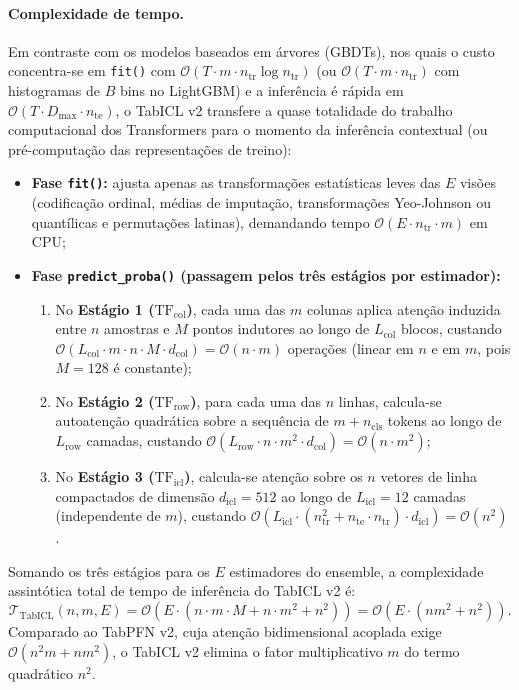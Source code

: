 \documentclass[11pt,a4paper]{article}
\begin{document}
\paragraph{Complexidade de tempo.}
Em contraste com os modelos baseados em árvores (GBDTs), nos quais o custo concentra-se em \texttt{fit()} com $\mathcal{O}(T \cdot m \cdot n_{\mathrm{tr}} \log n_{\mathrm{tr}})$ (ou $\mathcal{O}(T \cdot m \cdot n_{\mathrm{tr}})$ com histogramas de $B$ bins no LightGBM) e a inferência é rápida em $\mathcal{O}(T \cdot D_{\max} \cdot n_{\mathrm{te}})$, o TabICL v2 transfere a quase totalidade do trabalho computacional dos Transformers para o momento da inferência contextual (ou pré-computação das representações de treino):
\begin{itemize}[leftmargin=2em]
    \item \textbf{Fase \texttt{fit()}:} ajusta apenas as transformações estatísticas leves das $E$ visões (codificação ordinal, médias de imputação, transformações Yeo-Johnson ou quantílicas e permutações latinas), demandando tempo $\mathcal{O}(E \cdot n_{\mathrm{tr}} \cdot m)$ em CPU;
    \item \textbf{Fase \texttt{predict\_proba()} (passagem pelos três estágios por estimador):}
    \begin{enumerate}
        \item No \textbf{Estágio 1 ($\mathrm{TF}_{\mathrm{col}}$)}, cada uma das $m$ colunas aplica atenção induzida entre $n$ amostras e $M$ pontos indutores ao longo de $L_{\mathrm{col}}$ blocos, custando $\mathcal{O}(L_{\mathrm{col}} \cdot m \cdot n \cdot M \cdot d_{\mathrm{col}}) = \mathcal{O}(n \cdot m)$ operações (linear em $n$ e em $m$, pois $M = 128$ é constante);
        \item No \textbf{Estágio 2 ($\mathrm{TF}_{\mathrm{row}}$)}, para cada uma das $n$ linhas, calcula-se autoatenção quadrática sobre a sequência de $m + n_{\mathrm{cls}}$ tokens ao longo de $L_{\mathrm{row}}$ camadas, custando $\mathcal{O}(L_{\mathrm{row}} \cdot n \cdot m^2 \cdot d_{\mathrm{col}}) = \mathcal{O}(n \cdot m^2)$;
        \item No \textbf{Estágio 3 ($\mathrm{TF}_{\mathrm{icl}}$)}, calcula-se atenção sobre os $n$ vetores de linha compactados de dimensão $d_{\mathrm{icl}} = 512$ ao longo de $L_{\mathrm{icl}} = 12$ camadas (independente de $m$), custando $\mathcal{O}(L_{\mathrm{icl}} \cdot (n_{\mathrm{tr}}^2 + n_{\mathrm{te}} \cdot n_{\mathrm{tr}}) \cdot d_{\mathrm{icl}}) = \mathcal{O}(n^2)$.
    \end{enumerate}
\end{itemize}
Somando os três estágios para os $E$ estimadores do ensemble, a complexidade assintótica total de tempo de inferência do TabICL v2 é:
\begin{equation}
    \mathcal{T}_{\mathrm{TabICL}}(n, m, E) = \mathcal{O}\!\left(E \cdot \left(n \cdot m \cdot M + n \cdot m^2 + n^2\right)\right) = \mathcal{O}\!\left(E \cdot (n m^2 + n^2)\right).
    \label{eq:time_complexity}
\end{equation}
Comparado ao TabPFN v2, cuja atenção bidimensional acoplada exige $\mathcal{O}(n^2 m + n m^2)$, o TabICL v2 elimina o fator multiplicativo $m$ do termo quadrático $n^2$.
\end{document}
